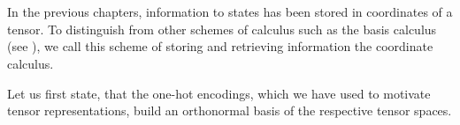 \chapter{\chatextcoordinateCalculus} \label{cha:coordinateCalculus}

In the previous chapters, information to states has been stored in coordinates of a tensor.
To distinguish from other schemes of calculus such as the basis calculus (see ), we call this scheme of storing and retrieving information the coordinate calculus.


Let us first state, that the one-hot encodings, which we have used to motivate tensor representations, build an orthonormal basis of the respective tensor spaces.

